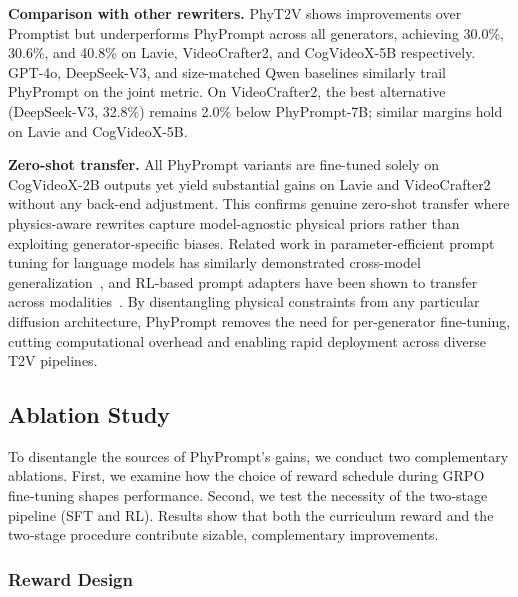 \noindent\textbf{Comparison with other rewriters.} PhyT2V shows improvements over Promptist but underperforms PhyPrompt across all generators, achieving 30.0\%, 30.6\%, and 40.8\% on Lavie, VideoCrafter2, and CogVideoX-5B respectively. GPT-4o, DeepSeek-V3, and size-matched Qwen baselines similarly trail PhyPrompt on the joint metric. On VideoCrafter2, the best alternative (DeepSeek-V3, 32.8\%) remains 2.0\% below PhyPrompt-7B; similar margins hold on Lavie and CogVideoX-5B.

\noindent\textbf{Zero-shot transfer.} All PhyPrompt variants are fine-tuned solely on CogVideoX-2B outputs yet yield substantial gains on Lavie and VideoCrafter2 without any back-end adjustment. This confirms genuine zero-shot transfer where physics-aware rewrites capture model-agnostic physical priors rather than exploiting generator-specific biases. Related work in parameter-efficient prompt tuning for language models has similarly demonstrated cross-model generalization~\cite{lester2021power,li2021prefix}, and RL-based prompt adapters have been shown to transfer across modalities~\cite{hao2023promptist}. By disentangling physical constraints from any particular diffusion architecture, PhyPrompt removes the need for per-generator fine-tuning, cutting computational overhead and enabling rapid deployment across diverse T2V pipelines.



\subsection{Ablation Study}
To disentangle the sources of PhyPrompt’s gains, we conduct two complementary ablations.
First, we examine how the choice of reward schedule during GRPO fine‑tuning shapes performance.
Second, we test the necessity of the two‑stage pipeline (SFT and RL).
Results show that both the curriculum reward and the two‑stage procedure contribute sizable, complementary improvements.

\subsubsection{Reward Design}
\label{sec:reward_design}

